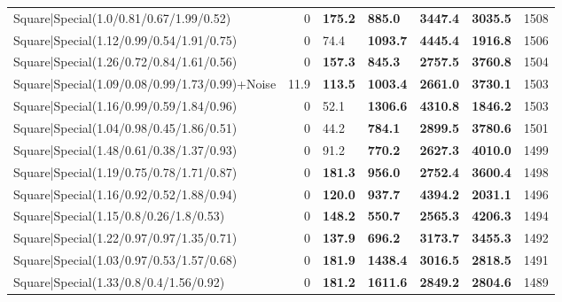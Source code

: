 \begin{tabular}{lrllllr}
 Square|Special(1.0/0.81/0.67/1.99/0.52)                       &             0   & \textbf{175.2} & \textbf{885.0}  & \textbf{3447.4} & \textbf{3035.5} &         1508 \\
 Square|Special(1.12/0.99/0.54/1.91/0.75)                      &             0   & 74.4           & \textbf{1093.7} & \textbf{4445.4} & \textbf{1916.8} &         1506 \\
 Square|Special(1.26/0.72/0.84/1.61/0.56)                      &             0   & \textbf{157.3} & \textbf{845.3}  & \textbf{2757.5} & \textbf{3760.8} &         1504 \\
 Square|Special(1.09/0.08/0.99/1.73/0.99)+Noise                &            11.9 & \textbf{113.5} & \textbf{1003.4} & \textbf{2661.0} & \textbf{3730.1} &         1503 \\
 Square|Special(1.16/0.99/0.59/1.84/0.96)                      &             0   & 52.1           & \textbf{1306.6} & \textbf{4310.8} & \textbf{1846.2} &         1503 \\
 Square|Special(1.04/0.98/0.45/1.86/0.51)                      &             0   & 44.2           & \textbf{784.1}  & \textbf{2899.5} & \textbf{3780.6} &         1501 \\
 Square|Special(1.48/0.61/0.38/1.37/0.93)                      &             0   & 91.2           & \textbf{770.2}  & \textbf{2627.3} & \textbf{4010.0} &         1499 \\
 Square|Special(1.19/0.75/0.78/1.71/0.87)                      &             0   & \textbf{181.3} & \textbf{956.0}  & \textbf{2752.4} & \textbf{3600.4} &         1498 \\
 Square|Special(1.16/0.92/0.52/1.88/0.94)                      &             0   & \textbf{120.0} & \textbf{937.7}  & \textbf{4394.2} & \textbf{2031.1} &         1496 \\
 Square|Special(1.15/0.8/0.26/1.8/0.53)                        &             0   & \textbf{148.2} & \textbf{550.7}  & \textbf{2565.3} & \textbf{4206.3} &         1494 \\
 Square|Special(1.22/0.97/0.97/1.35/0.71)                      &             0   & \textbf{137.9} & \textbf{696.2}  & \textbf{3173.7} & \textbf{3455.3} &         1492 \\
 Square|Special(1.03/0.97/0.53/1.57/0.68)                      &             0   & \textbf{181.9} & \textbf{1438.4} & \textbf{3016.5} & \textbf{2818.5} &         1491 \\
 Square|Special(1.33/0.8/0.4/1.56/0.92)                        &             0   & \textbf{181.2} & \textbf{1611.6} & \textbf{2849.2} & \textbf{2804.6} &         1489 \\

\end{tabular}
